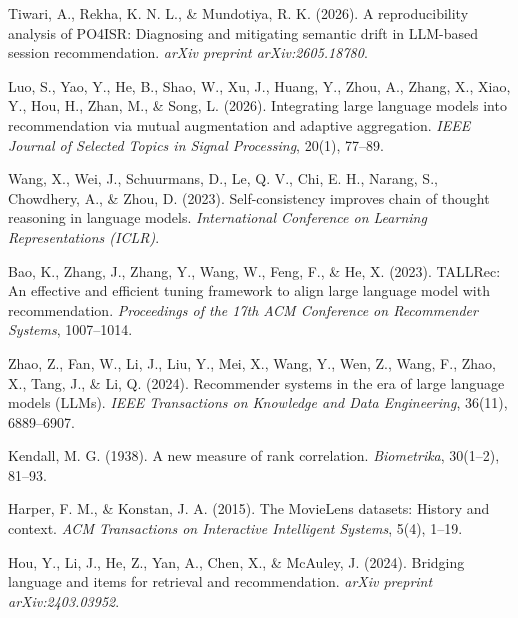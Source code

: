 \documentclass[12pt,a4paper,oneside]{report}
\begin{document}
\begin{enumerate}[label={[\arabic*]},leftmargin=*,itemsep=6pt]
\item Tiwari, A., Rekha, K. N. L., \& Mundotiya, R. K. (2026). A reproducibility
analysis of PO4ISR: Diagnosing and mitigating semantic drift in LLM-based session
recommendation. \emph{arXiv preprint arXiv:2605.18780}.

\item Luo, S., Yao, Y., He, B., Shao, W., Xu, J., Huang, Y., Zhou, A., Zhang, X.,
Xiao, Y., Hou, H., Zhan, M., \& Song, L. (2026). Integrating large language
models into recommendation via mutual augmentation and adaptive aggregation.
\emph{IEEE Journal of Selected Topics in Signal Processing}, 20(1), 77--89.

\item Wang, X., Wei, J., Schuurmans, D., Le, Q. V., Chi, E. H., Narang, S.,
Chowdhery, A., \& Zhou, D. (2023). Self-consistency improves chain of thought
reasoning in language models. \emph{International Conference on Learning
Representations (ICLR)}.

\item Bao, K., Zhang, J., Zhang, Y., Wang, W., Feng, F., \& He, X. (2023).
TALLRec: An effective and efficient tuning framework to align large language
model with recommendation. \emph{Proceedings of the 17th ACM Conference on
Recommender Systems}, 1007--1014.

\item Zhao, Z., Fan, W., Li, J., Liu, Y., Mei, X., Wang, Y., Wen, Z., Wang, F.,
Zhao, X., Tang, J., \& Li, Q. (2024). Recommender systems in the era of large
language models (LLMs). \emph{IEEE Transactions on Knowledge and Data
Engineering}, 36(11), 6889--6907.

\item Kendall, M. G. (1938). A new measure of rank correlation.
\emph{Biometrika}, 30(1--2), 81--93.

\item Harper, F. M., \& Konstan, J. A. (2015). The MovieLens datasets: History
and context. \emph{ACM Transactions on Interactive Intelligent Systems}, 5(4),
1--19.

\item Hou, Y., Li, J., He, Z., Yan, A., Chen, X., \& McAuley, J. (2024). Bridging
language and items for retrieval and recommendation. \emph{arXiv preprint
arXiv:2403.03952}.

\end{enumerate}
\end{document}
